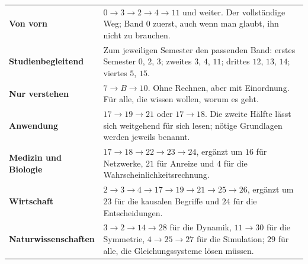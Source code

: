 \begin{merksatz}
\begin{center}
{\small
\renewcommand{\arraystretch}{1.55}
\begin{tabular}{@{}P{3.2cm}P{5.4cm}@{}}
\toprule
\textbf{Von vorn} & $0 \to 3 \to 2 \to 4 \to 11$ und weiter. Der vollständige Weg; Band 0 zuerst, auch wenn man glaubt, ihn nicht zu brauchen.\\
\textbf{Studienbegleitend} & Zum jeweiligen Semester den passenden Band: erstes Semester $0$, $2$, $3$; zweites $3$, $4$, $11$; drittes $12$, $13$, $14$; viertes $5$, $15$.\\
\textbf{Nur verstehen} & $7 \to B \to 10$. Ohne Rechnen, aber mit Einordnung. Für alle, die wissen wollen, worum es geht.\\
\textbf{Anwendung} & $17 \to 19 \to 21$ oder $17 \to 18$. Die zweite Hälfte lässt sich weitgehend für sich lesen; nötige Grundlagen werden jeweils benannt.\\
\textbf{Medizin und Biologie} & $17 \to 18 \to 22 \to 23 \to 24$, ergänzt um $16$ für Netzwerke, $21$ für Anreize und $4$ für die Wahrscheinlichkeitsrechnung.\\
\textbf{Wirtschaft} & $2 \to 3 \to 4 \to 17 \to 19 \to 21 \to 25 \to 26$, ergänzt um $23$ für die kausalen Begriffe und $24$ für die Entscheidungen.\\
\textbf{Natur\-wissenschaften} & $3 \to 2 \to 14 \to 28$ für die Dynamik, $11 \to 30$ für die Symmetrie, $4 \to 25 \to 27$ für die Simulation; $29$ für alle, die Gleichungssysteme lösen müssen.\\
\bottomrule
\end{tabular}}
\end{center}

\begin{center}
\begin{minipage}{0.88\textwidth}
\end{minipage}
\end{center}
\end{merksatz}

